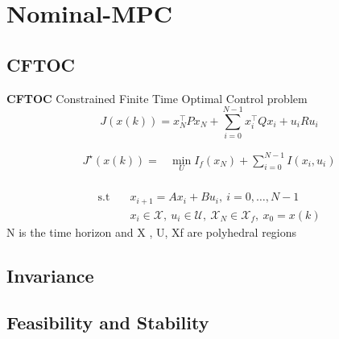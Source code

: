 \section{Nominal-MPC}


\subsection{CFTOC}

\begin{sstTitleBox}[ForestGreen]{\textbf{\large
			CFTOC
		}
		Constrained Finite Time Optimal Control problem
	}
	\[
		J(x(k)) = x_N^\top P x_N + \sum_{i=0}^{N-1}x_i^\top Q x_i + u_i R u_i
	\]
	\begin{centering}
		\begin{sstFrame}[ForestGreen]
			\vspace{-1.5mm}
			\color{white}
			\[ \begin{aligned}
					J^\star (x(k)) = & \min_{U}  I_f(x_N) + \sum_{i=0}^{N-1} I(x_{i}, u_{i}) \\
				\end{aligned} \]
			\vspace{-2.5mm}
		\end{sstFrame}
		\[ \begin{aligned}
				\text{s.t} \quad & x_{i+1} = A x_{i} + Bu_{i},\ i = 0,\dots,N-1                                                  \\
				                 & x_{i} \in \mathcal{X},\ u_{i} \in \mathcal{U},\ \mathcal{X}_N \in \mathcal{X}_f, \ x_0 = x(k)
			\end{aligned} \]
		N is the time horizon and X , U, Xf are polyhedral regions
	\end{centering}
\end{sstTitleBox}



%

\subsection{Invariance}



\subsection{Feasibility and Stability}


